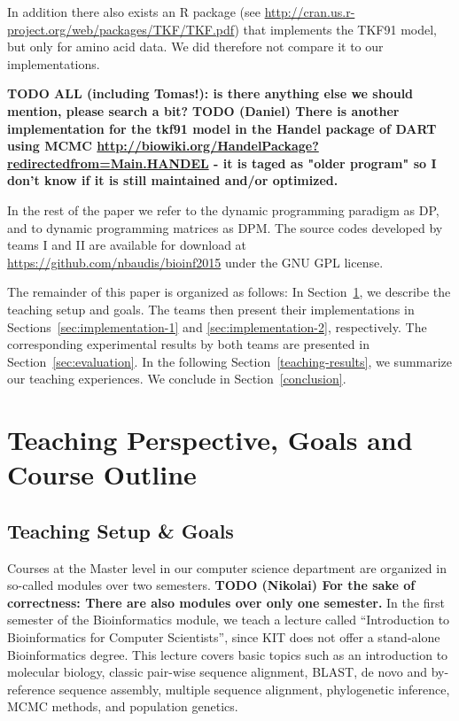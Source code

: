\documentclass[runningheads,a4paper]{llncs}
\begin{document}
In addition there also exists an R package (see \url{http://cran.us.r-project.org/web/packages/TKF/TKF.pdf}) that implements the TKF91 model, but only for amino acid data. 
We did therefore not compare it to our implementations. 

{\bf TODO ALL (including Tomas!): is there anything else we should mention, please search a bit?}
{\bf TODO (Daniel) There is another implementation for the tkf91 model in the Handel package of DART using MCMC \url{http://biowiki.org/HandelPackage?redirectedfrom=Main.HANDEL} - it is taged as "older program" so I don't know if it is still maintained and/or optimized.}

In the rest of the paper we refer to the dynamic programming paradigm as DP, and to dynamic programming matrices as DPM.
The source codes developed by teams I and II are available for download at \url{https://github.com/nbaudis/bioinf2015} under the GNU GPL license.

The remainder of this paper is organized as follows: In Section~\ref{teaching}, we describe the teaching setup and goals. 
The teams then present their implementations in Sections~\ref{sec:implementation-1} and \ref{sec:implementation-2}, respectively. 
The corresponding experimental results by both teams are presented in Section~\ref{sec:evaluation}.
In the following Section~\ref{teaching-results}, we summarize our teaching experiences.
We conclude in Section~\ref{conclusion}.

\section{Teaching Perspective, Goals and Course Outline}
\label{teaching} 

\subsection{Teaching Setup \& Goals} 
\label{setup}

Courses at the Master level in our computer science department are organized in so-called modules over two semesters.
\textbf{TODO (Nikolai) For the sake of correctness: There are also modules over
only one semester.}
In the first semester of the Bioinformatics module, we teach a lecture called ``Introduction to Bioinformatics for Computer Scientists'', since KIT does not offer
a stand-alone Bioinformatics degree. This lecture covers basic topics such as an introduction to molecular biology, classic pair-wise sequence alignment,
BLAST, de novo and by-reference sequence assembly, multiple sequence alignment, phylogenetic inference, MCMC methods, and population genetics.
\end{document}
